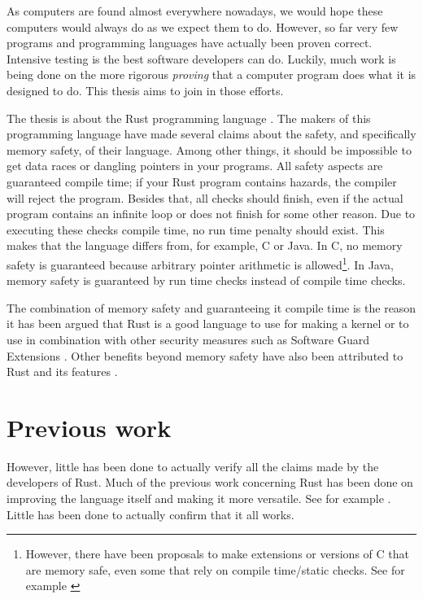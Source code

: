As computers are found almost everywhere nowadays, we would hope these computers would always do as we expect them to do. However, so far very few programs and programming languages have actually been proven correct. Intensive testing is the best software developers can do. Luckily, much work is being done on the more rigorous \emph{proving} that a computer program does what it is designed to do. This thesis aims to join in those efforts. 

The thesis is about the Rust programming language \citep{matsakis2014rust}. The makers of this programming language have made several claims about the safety, and specifically memory safety, of their language. Among other things, it should be impossible to get data races or dangling pointers in your programs. All safety aspects are guaranteed compile time; if your Rust program contains hazards, the compiler will reject the program. Besides that, all checks should finish, even if the actual program contains an infinite loop or does not finish for some other reason. Due to executing these checks compile time, no run time penalty should exist. This makes that the language differs from, for example, C or Java. In C, no memory safety is guaranteed because arbitrary pointer arithmetic is allowed\footnote{However, there have been proposals to make extensions or versions of C that are memory safe, even some that rely on compile time/static checks. See for example \cite{dhurjati2003memory}}. In Java, memory safety is guaranteed by run time checks instead of compile time checks. 

The combination of memory safety and guaranteeing it compile time is the reason it has been argued that Rust is a good language to use for making a kernel \citep{levy2017kernel} or to use in combination with other security measures such as Software Guard Extensions \citep{ding2017sgx}. Other benefits beyond memory safety have also been attributed to Rust and its features \citep{balasubramanian2017system}.

\section{Previous work}
However, little has been done to actually verify all the claims made by the developers of Rust. Much of the previous work concerning Rust has been done on improving the language itself and making it more versatile. See for example \cite{jespersen2015session}. Little has been done to actually confirm that it all works. 

